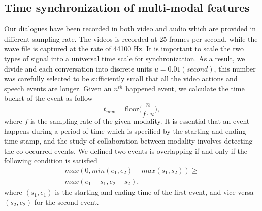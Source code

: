 \documentclass[10pt,journal,compsoc]{IEEEtran}
\begin{document}
\subsection{Time synchronization of multi-modal features}
Our dialogues have been recorded in both video and audio which are provided in different sampling rate. The videos is recorded at 25 frames per second, while the wave file is captured at the rate of 44100 Hz. It is important to scale the two types of signal into a universal time scale for synchronization. As a result, we divide and each conversation into discrete units $u = 0.01 (second)$, this number was carefully selected to be sufficiently small that all the video actions and speech events are longer. Given an $n^{th}$ happened event, we calculate the time bucket of the event as follow
\[
    t_{new} = \mathrm{floor}\bigg(\frac{n}{f \cdot u}\bigg),
\]
where $f$ is the sampling rate of the given modality. It is essential that an event happens during a period of time which is specified by the starting and ending time-stamp, and the study of collaboration between modality involves detecting the co-occurred events. We defined two events is overlapping if and only if the following condition is satisfied
\begin{equation}
\begin{aligned}
    max(0, min(e_1, e_2) - max(s_1, s_2)) \geq \\
    max(e_1 - s_1, e_2 - s_2),
\end{aligned}
\end{equation}
where $(s_1,e_1)$ is the starting and ending time of the first event, and vice versa $(s_2, e_2)$ for the second event.

\end{document}
